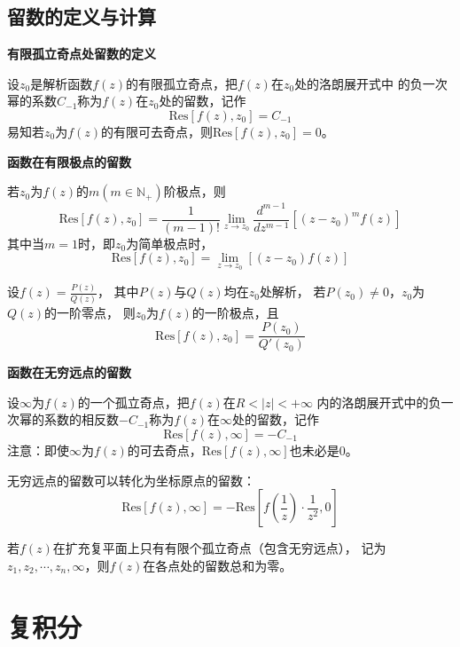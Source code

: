 \documentclass[a4paper,12pt]{article}
\begin{document}
\subsection{留数的定义与计算}

\noindent
\textbf{有限孤立奇点处留数的定义}

设$z_0$是解析函数$f\left(z\right)$的有限孤立奇点，把$f\left(z\right)$在$z_0$处的洛朗展开式中
的负一次幂的系数$C_{-1}$称为$f\left(z\right)$在$z_0$处的留数，记作
$$
\text{Res}\left[f\left(z\right),z_0\right]=C_{-1}
$$
易知若$z_0$为$f\left(z\right)$的有限可去奇点，则$\text{Res}\left[f\left(z\right),z_0\right]=0$。

\noindent
\textbf{函数在有限极点的留数}

若$z_0$为$f\left(z\right)$的$m\left(m\in\mathbb{N}_+\right)$阶极点，则
$$
\text{Res}\left[f\left(z\right),z_0\right]=\frac1{\left(m-1\right)!}
\lim_{z\to z_0}\frac{d^{m-1}}{dz^{m-1}}\left[\left(z-z_0\right)^mf\left(z\right)\right]
$$
其中当$m=1$时，即$z_0$为简单极点时，
$$
\text{Res}\left[f\left(z\right),z_0\right]=
\lim_{z\to z_0}\left[\left(z-z_0\right)f\left(z\right)\right]
$$

设$f\left(z\right)=\frac{P\left(z\right)}{Q\left(z\right)}$，
其中$P\left(z\right)$与$Q\left(z\right)$均在$z_0$处解析，
若$P\left(z_0\right)\ne0$，$z_0$为$Q\left(z\right)$的一阶零点，
则$z_0$为$f\left(z\right)$的一阶极点，且
$$
\text{Res}\left[f\left(z\right),z_0\right]=\frac{P\left(z_0\right)}{Q'\left(z_0\right)}
$$

\noindent
\textbf{函数在无穷远点的留数}

设$\infty$为$f\left(z\right)$的一个孤立奇点，把$f\left(z\right)$在$R<\left|z\right|<+\infty$
内的洛朗展开式中的负一次幂的系数的相反数$-C_{-1}$称为$f\left(z\right)$在$\infty$处的留数，记作
$$
\text{Res}\left[f\left(z\right),\infty\right]=-C_{-1}
$$
注意：即使$\infty$为$f\left(z\right)$的可去奇点，$\text{Res}\left[f\left(z\right),\infty\right]$也未必是$0$。

无穷远点的留数可以转化为坐标原点的留数：
$$
\text{Res}\left[f\left(z\right),\infty\right]=
-\text{Res}\left[f\left(\frac1z\right)\cdot\frac1{z^2},0\right]
$$

若$f\left(z\right)$在扩充复平面上只有有限个孤立奇点（包含无穷远点），
记为$z_1,z_2,\cdots,z_n,\infty$，则$f\left(z\right)$在各点处的留数总和为零。

\section{复积分}
\end{document}
